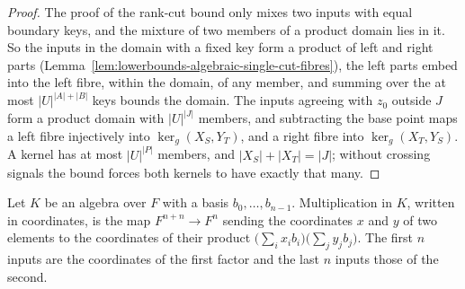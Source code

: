 \begin{proof}
  \leanok
  The proof of the rank-cut bound only mixes two inputs with equal boundary
  keys, and the mixture of two members of a product domain lies in it. So
  the inputs in the domain with a fixed key form a product of left and right
  parts (Lemma~\ref{lem:lowerbounds-algebraic-single-cut-fibres}), the left
  parts embed into the left fibre, within the domain, of any member, and
  summing over the at most $|U|^{|A|+|B|}$ keys bounds the domain. The
  inputs agreeing with $z_0$ outside $J$ form a product domain with
  $|U|^{|J|}$ members, and subtracting the base point maps a left fibre
  injectively into $\ker_g(X_S,Y_T)$, and a right fibre into
  $\ker_g(X_T,Y_S)$. A kernel has at most $|U|^{|P|}$ members, and
  $|X_S|+|X_T|=|J|$; without crossing signals the bound forces both
  kernels to have exactly that many.
\end{proof}

\begin{definition}
  \label{def:lowerbounds-algebraic-field-mul}
  \leanok
  Let $K$ be an algebra over $F$ with a basis $b_0,\dots,b_{n-1}$.
  Multiplication in $K$, written in coordinates, is the map
  $F^{n+n}\to F^n$ sending the coordinates $x$ and $y$ of two elements to
  the coordinates of their product
  $\bigl(\sum_i x_ib_i\bigr)\bigl(\sum_j y_jb_j\bigr)$. The first $n$
  inputs are the coordinates of the first factor and the last $n$ inputs
  those of the second.
\end{definition}

